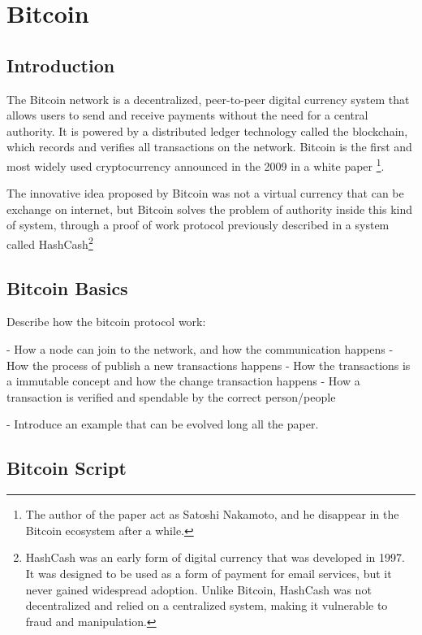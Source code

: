 \chapter{Bitcoin}

\section{Introduction}

The Bitcoin network is a decentralized, peer-to-peer digital currency system
that allows users to send and receive payments without the need for a
central authority. It is powered by a distributed ledger technology called the blockchain, which records and verifies all transactions on the network.
Bitcoin is the first and most widely used cryptocurrency announced in the 2009
in a white paper \cite{nakamoto2009bitcoin}\footnote{The author of the paper act as
  Satoshi Nakamoto, and he disappear in the Bitcoin ecosystem after a while.}.

The innovative idea proposed by Bitcoin was not a virtual currency that can be
exchange on internet, but Bitcoin solves the problem of authority inside this kind
of system, through a proof of work protocol previously described in a system called HashCash\cite{back2002hashcash}\footnote{HashCash was an early form of digital currency that was developed in 1997. It was designed to be used as a form of payment for email services, but it never gained widespread adoption. Unlike Bitcoin, HashCash was not decentralized and relied on a centralized system, making it vulnerable to fraud and manipulation.}

\section{Bitcoin Basics}
\label{sec:basics}

Describe how the bitcoin protocol work:

- How a node can join to the network, and how the communication happens
- How the process of publish a new transactions happens
- How the transactions is a immutable concept and how the change transaction happens
- How a transaction is verified and spendable by the correct person/people

- Introduce an example that can be evolved long all the paper.

\section{Bitcoin Script}

